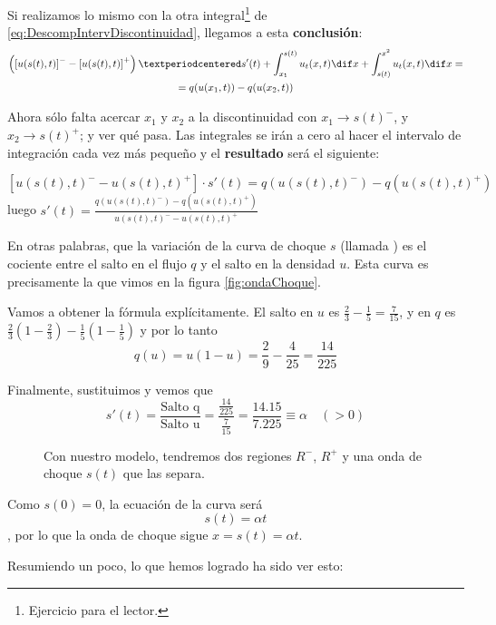 		Si realizamos lo mismo con la otra integral\footnote{Ejercicio para el lector.} de \eqref{eq:DescompIntervDiscontinuidad}, llegamos a esta \textbf{conclusión}:
		\begin{multline*}
		\left(\left[u(s(t),t)\right]^{-} - \left[u(s(t),t)\right]^{+}\right)· s'(t) + \int^{s(t)}_{x_1} u_t(x,t) \dif x + \int^{x^2}_{s(t)} u_t(x,t) \dif x = \\ = q(u(x_1,t)) - q(u(x_2,t))
		\end{multline*}

		Ahora sólo falta acercar $x_1$ y $x_2$ a la discontinuidad con $x_1 \to s(t)^{-}$, y $x_2 \to s(t)^{+}$; y ver qué pasa. Las integrales se irán a cero al hacer el intervalo de integración cada vez más pequeño y el \textbf{resultado} será el siguiente:

		\[ \left[ u(s(t),t)^{-} - u(s(t),t)^{+} \right] · s'(t) = q(u(s(t),t)^{-}) - q(u(s(t),t)^{+}) \] luego
		\( s'(t) = \frac{q(u(s(t),t)^{-}) - q(u(s(t),t)^{+})}{u(s(t),t)^{-} - u(s(t),t)^{+}} \label{eq:DerivadaOndaChoque} \)

		En otras palabras, que la variación de la curva de choque $s$ (llamada ) es el cociente entre el salto en el flujo $q$ y el salto en la densidad $u$. Esta curva es precisamente la que vimos en la figura \ref{fig:ondaChoque}.

		Vamos a obtener la fórmula explícitamente. El salto en $u$ es $\frac{2}{3} - \frac{1}{5} = \frac{7}{15}$, y en $q$ es $\frac{2}{3} (1-\frac{2}{3}) - \frac{1}{5}(1-\frac{1}{5})$ y por lo tanto
		\[ q(u) = u (1-u) = \frac{2}{9} - \frac{4}{25} = \frac{14}{225} \]

		Finalmente, sustituimos y vemos que \[
		s'(t) = \frac{\text{Salto q}}{\text{Salto u}} = \frac{\frac{14}{225}}{\frac{7}{15}} = \frac{14.15}{7.225} \equiv \alpha \quad(>0) \]

		\begin{wrapfigure}[10]{R}{0.4\textwidth}
			\centering
			\vspace{-15pt}
			\vspace{-10pt}
			\caption{Con nuestro modelo, tendremos dos regiones $R^-$, $R^+$ y una onda de choque $s(t)$ que las separa.}
			\label{fig:OndaChoqueRPM}
		\end{wrapfigure}

		Como $s(0) = 0$, la ecuación de la curva será \[
		s(t) = \alpha t \],
		por lo que la onda de choque sigue $x = s(t) = \alpha t$.

			Resumiendo un poco, lo que hemos logrado ha sido ver esto:

